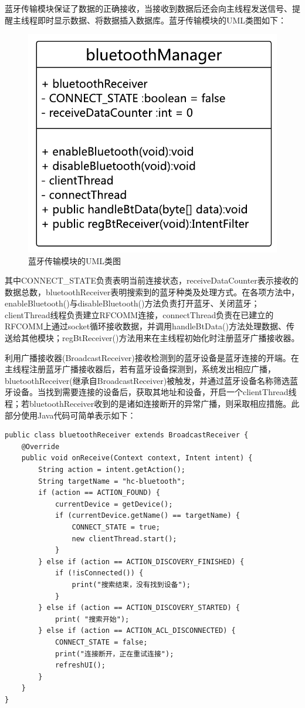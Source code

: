 蓝牙传输模块保证了数据的正确接收，当接收到数据后还会向主线程发送信号、提醒主线程即时显示数据、将数据插入数据库。蓝牙传输模块的UML类图如下：

\begin{figure}[htbp]
\centering
\includegraphics[width=0.5\columnwidth]{fig3-7.png}
\caption{
\label{fig3-7}
蓝牙传输模块的UML类图
}
\end{figure}

其中CONNECT\_STATE负责表明当前连接状态，receiveDataCounter表示接收的数据总数，bluetoothReceiver表明搜索到的蓝牙种类及处理方式。在各项方法中，enableBluetooth()与disableBluetooth()方法负责打开蓝牙、关闭蓝牙；clientThread线程负责建立RFCOMM连接，connectThread负责在已建立的RFCOMM上通过socket循环接收数据，并调用handleBtData()方法处理数据、传送给其他模块；regBtReceiver()方法用来在主线程初始化时注册蓝牙广播接收器。

利用广播接收器(BroadcastReceiver)接收检测到的蓝牙设备是蓝牙连接的开端。在主线程注册蓝牙广播接收器后，若有蓝牙设备探测到，系统发出相应广播，bluetoothReceiver(继承自BroadcastReceiver)被触发，并通过蓝牙设备名称筛选蓝牙设备。当找到需要连接的设备后，获取其地址和设备，开启一个clientThread线程；若bluetoothReceiver收到的是诸如连接断开的异常广播，则采取相应措施。此部分使用Java代码可简单表示如下：
\begin{center}
\begin{lstlisting}
public class bluetoothReceiver extends BroadcastReceiver {
    @Override
    public void onReceive(Context context, Intent intent) {
        String action = intent.getAction();
        String targetName = "hc-bluetooth";
        if (action == ACTION_FOUND) {
            currentDevice = getDevice();
            if (currentDevice.getName() == targetName) {
                CONNECT_STATE = true;
                new clientThread.start();
            }
        } else if (action == ACTION_DISCOVERY_FINISHED) {
            if (!isConnected()) {
                print("搜索结束，没有找到设备");
            }
        } else if (action == ACTION_DISCOVERY_STARTED) {
            print( "搜索开始");
        } else if (action == ACTION_ACL_DISCONNECTED) {
            CONNECT_STATE = false;
            print("连接断开，正在重试连接");
            refreshUI();
        }
    }
}
\end{lstlisting}
\end{center}

